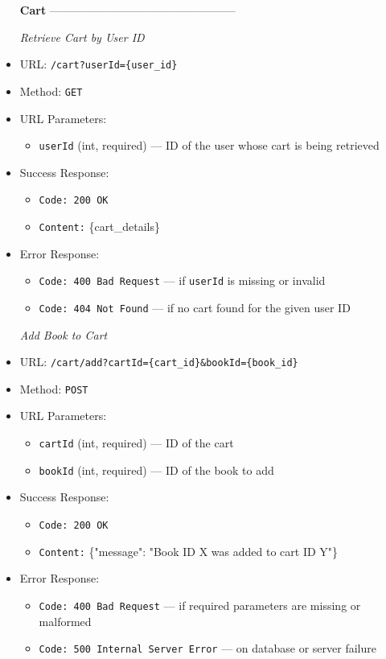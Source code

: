 \begin{itemize}
\item[\textbf{Cart}] --------------------------------------------------

\item[\textit{Retrieve Cart by User ID}]
\item URL: \texttt{/cart?userId=\{user\_id\}}  
\item Method: \texttt{GET}  
\item URL Parameters:
\begin{itemize}
  \item \texttt{userId} (int, required) — ID of the user whose cart is being retrieved
\end{itemize}
\item Success Response:
\begin{itemize}
  \item \texttt{Code: 200 OK}
  \item \texttt{Content:} \{cart\_details\}
\end{itemize}
\item Error Response:
\begin{itemize}
  \item \texttt{Code: 400 Bad Request} — if \texttt{userId} is missing or invalid  
  \item \texttt{Code: 404 Not Found} — if no cart found for the given user ID
\end{itemize}

\item[\textit{Add Book to Cart}] 
\item URL: \texttt{/cart/add?cartId=\{cart\_id\}&bookId=\{book\_id\}}  
\item Method: \texttt{POST}  
\item URL Parameters:
\begin{itemize}
  \item \texttt{cartId} (int, required) — ID of the cart
  \item \texttt{bookId} (int, required) — ID of the book to add
\end{itemize}
\item Success Response:
\begin{itemize}
  \item \texttt{Code: 200 OK}
  \item \texttt{Content:} \{"message": "Book ID X was added to cart ID Y"\}
\end{itemize}
\item Error Response:
\begin{itemize}
  \item \texttt{Code: 400 Bad Request} — if required parameters are missing or malformed  
  \item \texttt{Code: 500 Internal Server Error} — on database or server failure
\end{itemize}


\end{itemize}
